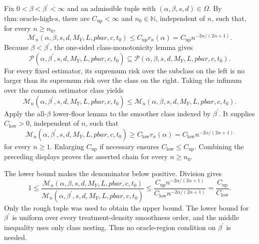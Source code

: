 Fix \(0<\beta<\beta^{\prime}<\infty\) and an admissible tuple with \((\alpha,\beta,s,d)\in\Omega\). By \(\mathrm{thm:oracle\text{-}high\text{-}s}\), there are \(C_{\mathrm{up}}<\infty\) and \(n_0\in\mathbb N\), independent of \(n\), such that, for every \(n\ge n_0\),
\[
\mathcal M_n(\alpha,\beta,s,d,M_Y,L,pbar,c,t_0)
\le C_{\mathrm{up}}r_n(\alpha)
=C_{\mathrm{up}}n^{-2\alpha/(2\alpha+1)}.
\]
Because \(\beta<\beta^{\prime}\), the one-sided class-monotonicity lemma gives
\[
\mathcal P(\alpha,\beta^{\prime},s,d,M_Y,L,pbar,c,t_0)
\subseteq
\mathcal P(\alpha,\beta,s,d,M_Y,L,pbar,c,t_0).
\]
For every fixed estimator, its supremum risk over the subclass on the left is no larger than its supremum risk over the class on the right. Taking the infimum over the common estimator class yields
\[
\mathcal M_n(\alpha,\beta^{\prime},s,d,M_Y,L,pbar,c,t_0)
\le
\mathcal M_n(\alpha,\beta,s,d,M_Y,L,pbar,c,t_0).
\]
Apply the all-\(\beta\) lower-floor lemma to the smoother class indexed by \(\beta^{\prime}\). It supplies \(C_{\mathrm{low}}>0\), independent of \(n\), such that
\[
\mathcal M_n(\alpha,\beta^{\prime},s,d,M_Y,L,pbar,c,t_0)
\ge C_{\mathrm{low}}r_n(\alpha)
=C_{\mathrm{low}}n^{-2\alpha/(2\alpha+1)}
\]
for every \(n\ge1\). Enlarging \(C_{\mathrm{up}}\) if necessary ensures \(C_{\mathrm{low}}\le C_{\mathrm{up}}\). Combining the preceding displays proves the asserted chain for every \(n\ge n_0\).

The lower bound makes the denominator below positive. Division gives
\[
1\le
\frac{\mathcal M_n(\alpha,\beta,s,d,M_Y,L,pbar,c,t_0)}
{\mathcal M_n(\alpha,\beta^{\prime},s,d,M_Y,L,pbar,c,t_0)}
\le
\frac{C_{\mathrm{up}}n^{-2\alpha/(2\alpha+1)}}
{C_{\mathrm{low}}n^{-2\alpha/(2\alpha+1)}}
=\frac{C_{\mathrm{up}}}{C_{\mathrm{low}}}.
\]
Only the rough tuple was used to obtain the upper bound. The lower bound for \(\beta^{\prime}\) is uniform over every treatment-density smoothness order, and the middle inequality uses only class nesting. Thus no oracle-region condition on \(\beta^{\prime}\) is needed.